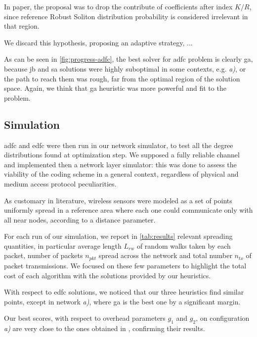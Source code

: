 \documentclass[12pt,journal,draftclsnofoot,onecolumn]{IEEEtran}
\makeatletter
\let\origsubsubsection\subsubsection
\renewcommand\subsubsection{\@ifstar{\starsubsubsection}{\nostarsubsubsection}}
\newcommand\nostarsubsubsection[1]
{\subsubsectionprelude\origsubsubsection{#1}}
\newcommand\subsubsectionprelude{%
  \vspace{6pt}
}
\makeatother
\begin{document}
In paper\cite{Lin2007}, the proposal was to drop the contribute of coefficients after index $K/R$, since reference Robust Soliton distribution probability is considered irrelevant in that region.

We discard this hypothesis, proposing an adaptive strategy, ...

As can be seen in \autoref{fig:progress-adfc}, the best solver for \gls{adfc} problem is clearly \gls{ga}, because \gls{jb} and \gls{sa} solutions were highly suboptimal in some contexts, e.g. \emph{a)}, or the path to reach them was rough, far from the optimal region of the solution space.
Again, we think that \gls{ga} heuristic was more powerful and fit to the problem.

\subsection{Simulation}
\gls{adfc} and \gls{edfc} were then run in our network simulator, to test all the degree distributions found at optimization step.
We supposed a fully reliable channel and implemented then a network layer simulator: this was done to assess the viability of the coding scheme in a general context, regardless of physical and medium access protocol peculiarities.

As customary in literature, wireless sensors were modeled as a set of points uniformly spread in a reference area where each one could communicate only with all near nodes, according to a distance parameter.

\subsubsection{Transmission cost}
For each run of our simulation, we report in \autoref{tab:results} relevant spreading quantities, in particular average length $L_{rw}$ of random walks taken by each packet, number of packets $n_{pkt}$ spread across the network and total number $n_{tx}$ of packet transmissions.
We focused on these few parameters to highlight the total cost of each algorithm with the solutions provided by our heuristics.

\smallbreak
With respect to \gls{edfc} solutions, we noticed that our three heuristics find similar points, except in network \emph{a)}, where \gls{ga} is the best one by a significant margin.

Our best scores, with respect to overhead parameters $g_1$ and $g_2$, on configuration \emph{a)} are very close to the ones obtained in \cite{Lin2007}, confirming their results.
\end{document}

